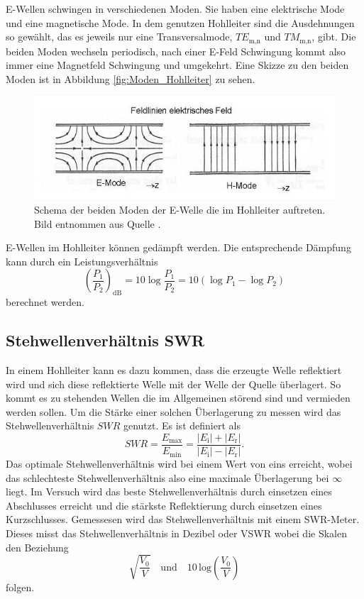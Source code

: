 E-Wellen schwingen in verschiedenen Moden.
Sie haben eine elektrische Mode und eine magnetische Mode.
In dem genutzen Hohlleiter sind die Ausdehnungen so gewählt, das es jeweils nur eine Transversalmode, $TE_\text{m,n}$ und $TM_\text{m,n}$, gibt.
Die beiden Moden wechseln periodisch, nach einer E-Feld Schwingung kommt also immer eine Magnetfeld Schwingung und umgekehrt.
Eine Skizze zu den beiden Moden ist in Abbildung \ref{fig:Moden_Hohlleiter} zu sehen.

\begin{figure}
    \centering
    \includegraphics[width=\textwidth]{content/data/Moden_Hohleiter.JPG}
    \caption{Schema der beiden Moden der E-Welle die im Hohlleiter auftreten. Bild entnommen aus Quelle \cite{wikipedia}.}
    \label{fig:Moden_Hohleiter}
\end{figure}

E-Wellen im Hohlleiter können gedämpft werden. Die entsprechende Dämpfung kann durch ein Leistungsverhältnis
\begin{equation}
    \left (\frac{P_1}{P_2} \right )_\text{dB} = 10 \log \frac{P_1}{P_2} = 10 \left ( \log P_1 - \log P_2 \right )
\end{equation}
berechnet werden.
\FloatBarrier

\subsection{Stehwellenverhältnis SWR}
\label{sec:swr}
In einem Hohlleiter kann es dazu kommen, dass die erzeugte Welle reflektiert wird und sich diese reflektierte Welle mit der Welle der Quelle überlagert.
So kommt es zu stehenden Wellen die im Allgemeinen störend sind und vermieden werden sollen.
Um die Stärke einer solchen Überlagerung zu messen wird das Stehwellenverhältnis $SWR$ genutzt.
Es ist definiert als 
\begin{equation}
    SWR = \frac{E _\text{max}}{E _\text{min}} = \frac{\left | E _\text{i} \right | + \left | E _\text{r} \right |}{\left | E _\text{i} \right | - \left | E _\text{r} \right |}.
\end{equation}
Das optimale Stehwellenverhältnis wird bei einem Wert von eins erreicht, wobei das schlechteste Stehwellenverhältnis also eine maximale Überlagerung bei $ \infty $ liegt.
Im Versuch wird das beste Stehwellenverhältnis durch einsetzen eines Abschlusses erreicht und die stärkste Reflektierung durch einsetzen eines Kurzschlusses.
Gemessesen wird das Stehwellenverhältnis mit einem SWR-Meter.
Dieses misst das Stehwellenverhältnis in Dezibel oder VSWR wobei die Skalen den Beziehung
\begin{equation*}
    \sqrt{\frac{V_0}{V}}  \quad \text{und}  \quad 10 \, \text{log} \left ( \frac{V_0}{V}\right )  
\end{equation*}
folgen.

